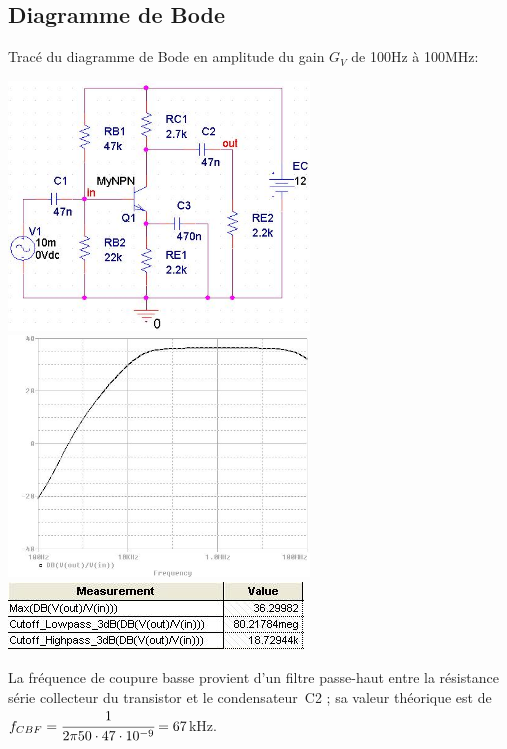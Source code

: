 \documentclass[10pt]{article}
\begin{document}
   \newpage

   \subsection{Diagramme de Bode}
    \begin{center}
     Tracé du diagramme de Bode en amplitude du gain $G_V$ de 100Hz à 100MHz:

     \includegraphics[width=8cm]{I-II-b_bode_circuit.jpg}
     \includegraphics[width=8cm]{I-II-b_bode_simu.jpg}
     \includegraphics{I-II-b_bode_values.jpg}
    \end{center}
    La fréquence de coupure basse provient d’un filtre passe-haut entre la
    résistance série collecteur du transistor et le condensateur C2 ; sa valeur
    théorique est de $f_{CBF}= \cfrac{1}{2\pi 50\cdot 47\cdot 10^{-9}} = 67$kHz.
\end{document}
